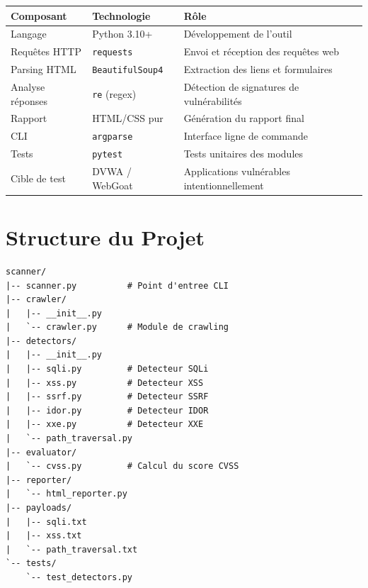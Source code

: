 \documentclass[12pt, a4paper]{report}
\begin{document}
\begin{center}
\begin{tabular}{l l >{\raggedright\arraybackslash}p{6cm}}
  \toprule
  \textbf{Composant} & \textbf{Technologie} & \textbf{Rôle} \\
  \midrule
  Langage           & Python 3.10+        & Développement de l'outil \\
  Requêtes HTTP     & \texttt{requests}   & Envoi et réception des requêtes web \\
  Parsing HTML      & \texttt{BeautifulSoup4} & Extraction des liens et formulaires \\
  Analyse réponses  & \texttt{re} (regex) & Détection de signatures de vulnérabilités \\
  Rapport           & HTML/CSS pur        & Génération du rapport final \\
  CLI               & \texttt{argparse}   & Interface ligne de commande \\
  Tests             & \texttt{pytest}     & Tests unitaires des modules \\
  Cible de test     & DVWA / WebGoat      & Applications vulnérables intentionnellement \\
  \bottomrule
\end{tabular}
\end{center}

\section{Structure du Projet}

\begin{lstlisting}[caption={Arborescence du projet}]
scanner/
|-- scanner.py          # Point d'entree CLI
|-- crawler/
|   |-- __init__.py
|   `-- crawler.py      # Module de crawling
|-- detectors/
|   |-- __init__.py
|   |-- sqli.py         # Detecteur SQLi
|   |-- xss.py          # Detecteur XSS
|   |-- ssrf.py         # Detecteur SSRF
|   |-- idor.py         # Detecteur IDOR
|   |-- xxe.py          # Detecteur XXE
|   `-- path_traversal.py
|-- evaluator/
|   `-- cvss.py         # Calcul du score CVSS
|-- reporter/
|   `-- html_reporter.py
|-- payloads/
|   |-- sqli.txt
|   |-- xss.txt
|   `-- path_traversal.txt
`-- tests/
    `-- test_detectors.py
\end{lstlisting}

\newpage

\end{document}
